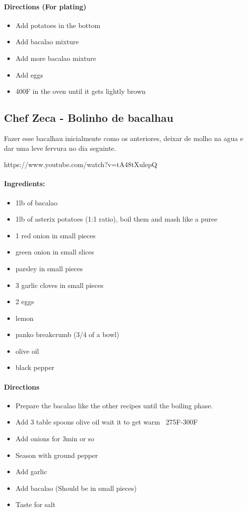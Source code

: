 \documentclass{article}
\begin{document}
\paragraph{Directions (For plating)}
\begin{itemize}
	\item Add potatoes in the bottom
	\item Add bacalao mixture
	\item Add more bacalao mixture
	\item Add eggs
	\item 400F in the oven until it gets lightly brown
\end{itemize}

\subsection{Chef Zeca - Bolinho de bacalhau}

Fazer esse bacalhau inicialmente como os anteriores, deixar de molho na agua e dar uma leve fervura no dia seguinte.

https://www.youtube.com/watch?v=tA48tXulepQ

\paragraph{Ingredients:}

\begin{itemize}
	\item 1lb of bacalao
	\item 1lb of asterix potatoes (1:1 ratio), boil them and mash like a puree
	\item 1 red onion in small pieces
	\item green onion in small slices
	\item parsley in small pieces
	\item 3 garlic cloves in small pieces
	\item 2 eggs
	\item lemon
	\item panko breakcrumb (3/4 of a bowl)
	\item olive oil
	\item black pepper
\end{itemize}

\paragraph{Directions}
\begin{itemize}
	\item Prepare the bacalao like the other recipes until the boiling phase.
	\item Add 3 table spoons olive oil wait it to get warm ~275F-300F
	\item Add onions for 3min or so
	\item Season with ground pepper
	\item Add garlic
	\item Add bacalao (Should be in small pieces)
	\item Taste for salt
\end{itemize}
\end{document}
